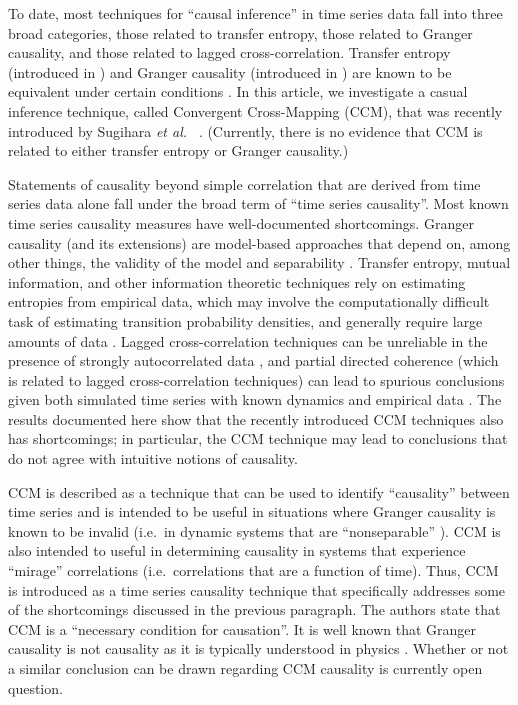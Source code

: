 \documentclass[twocolumn,aps,pre,groupedaddress]{revtex4-1}
\begin{document}
To date, most techniques for ``causal inference'' in time series data fall into three broad categories, those related to transfer entropy, those related to Granger causality, and those related to lagged cross-correlation.  Transfer entropy (introduced in \cite{Schreiber2000}) and Granger causality (introduced in \cite{granger1969}) are known to be equivalent under certain conditions \cite{Barnett2009}.  In this article, we investigate a casual inference technique, called Convergent Cross-Mapping (CCM), that was recently introduced by Sugihara {\em et al.\ } \cite{Sugihara2012}.  (Currently, there is no evidence that CCM is related to either transfer entropy or Granger causality.)

Statements of causality beyond simple correlation that are derived from time series data alone fall under the broad term of ``time series causality''.  Most known time series causality measures have well-documented shortcomings.  Granger causality (and its extensions) are model-based approaches that depend on, among other things, the validity of the model \cite{Kaminski2001,Granger1980} and separability \cite{Sugihara2012}.  Transfer entropy, mutual information, and other information theoretic techniques rely on estimating entropies from empirical data, which may involve the computationally difficult task of estimating transition probability densities, and generally require large amounts of data \cite{Kaiser2002,Schindler2007}.  Lagged cross-correlation techniques can be unreliable in the presence of strongly autocorrelated data \cite{box2013}, and partial directed coherence (which is related to lagged cross-correlation techniques) can lead to spurious conclusions given both simulated time series with known dynamics and empirical data \cite{pascual2014}.  The results documented here show that the recently introduced CCM techniques also has shortcomings; in particular, the CCM technique may lead to conclusions that do not agree with intuitive notions of causality.  

CCM is described as a technique that can be used to identify ``causality'' between time series and is intended to be useful in situations where Granger causality is known to be invalid (i.e.\ in dynamic systems that are ``nonseparable'' \cite{Sugihara2012}).  CCM is also intended to useful in determining causality in systems that experience ``mirage'' correlations \cite{Sugihara2012} (i.e.\ correlations that are a function of time).  Thus, CCM is introduced as a time series causality technique that specifically addresses some of the shortcomings discussed in the previous paragraph.  The authors state that CCM is a ``necessary condition for causation''.  It is well known that Granger causality is not causality as it is typically understood in physics \cite{Granger1980,liu2012,Roberts1985}.  Whether or not a similar conclusion can be drawn regarding CCM causality is currently open question. 
\end{document}
